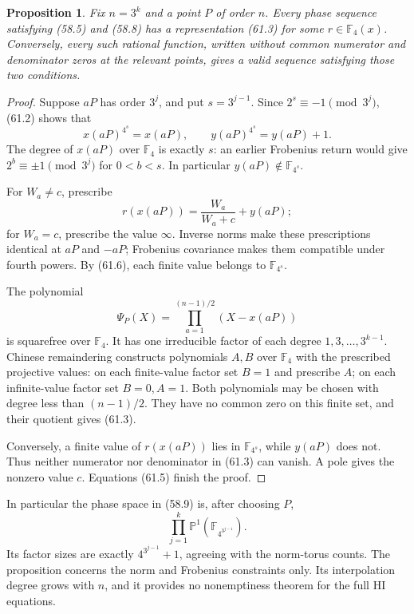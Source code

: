 \documentclass[11pt,reqno]{amsart}
\theoremstyle{plain}
\newtheorem{proposition}[theorem]{Proposition}
\begin{document}
\begin{proposition}
Fix \(n=3^k\) and a point \(P\) of order \(n\).
Every phase sequence satisfying (58.5) and (58.8) has a representation
(61.3) for some \(r\in\mathbb F_4(x)\). Conversely, every such rational
function, written without common numerator and denominator zeros at the
relevant points, gives a valid sequence satisfying those two conditions.
\end{proposition}

\begin{proof}
Suppose \(aP\) has order \(3^j\), and put \(s=3^{j-1}\).
Since \(2^s\equiv-1\pmod{3^j}\), (61.2) shows that
\begin{equation*}
 x(aP)^{4^s}=x(aP),\qquad y(aP)^{4^s}=y(aP)+1.
 \tag{61.6}
\end{equation*}
The degree of \(x(aP)\) over \(\mathbb F_4\) is exactly \(s\):
an earlier Frobenius return would give
\(2^b\equiv\pm1\pmod{3^j}\) for \(0<b<s\).
In particular \(y(aP)\notin\mathbb F_{4^s}\).

For \(W_a\ne c\), prescribe
\begin{equation*}
 r(x(aP))=\frac{W_a}{W_a+c}+y(aP);
 \tag{61.7}
\end{equation*}
for \(W_a=c\), prescribe the value \(\infty\).
Inverse norms make these prescriptions identical at \(aP\) and
\(-aP\); Frobenius covariance makes them compatible under fourth
powers. By (61.6), each finite value belongs to \(\mathbb F_{4^s}\).

The polynomial
\begin{equation*}
 \Psi_P(X)=\prod_{a=1}^{(n-1)/2}(X-x(aP))
 \tag{61.8}
\end{equation*}
is squarefree over \(\mathbb F_4\). It has one irreducible factor of
each degree \(1,3,\ldots,3^{k-1}\). Chinese remaindering constructs
polynomials \(A,B\) over \(\mathbb F_4\) with the prescribed projective
values: on each finite-value factor set \(B=1\) and prescribe \(A\);
on each infinite-value factor set \(B=0,A=1\). Both polynomials may be
chosen with degree less than \((n-1)/2\). They have no common zero on
this finite set, and their quotient gives (61.3).

Conversely, a finite value of \(r(x(aP))\) lies in
\(\mathbb F_{4^s}\), while \(y(aP)\) does not. Thus neither numerator
nor denominator in (61.3) can vanish. A pole gives the nonzero value
\(c\). Equations (61.5) finish the proof.
\end{proof}

In particular the phase space in (58.9) is, after choosing \(P\),
\begin{equation*}
 \prod_{j=1}^k\mathbb P^1(\mathbb F_{4^{3^{j-1}}}).
 \tag{61.9}
\end{equation*}
Its factor sizes are exactly \(4^{3^{j-1}}+1\), agreeing with the
norm-torus counts. The proposition concerns the norm and Frobenius
constraints only. Its interpolation degree grows with \(n\), and it
provides no nonemptiness theorem for the full HI equations.
\end{document}
